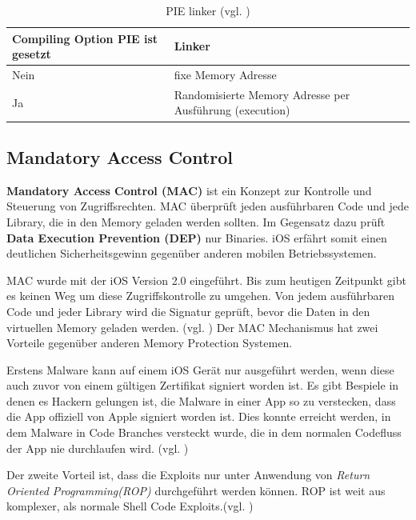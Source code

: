  \begin{table}
    \begin{center}
        \begin{tabular}{|p{6cm}|p{9cm}|} \hline
            Compiling Option PIE ist gesetzt & Linker  \\ \hline
            Nein & fixe Memory Adresse\\ \hline
            Ja & Randomisierte Memory Adresse per Ausführung (execution)\\ \hline
        \end{tabular}
        \caption{PIE linker (vgl. \cite{iOSSec[5]})}
       \label{tab:PIE linker }
    \end{center}
\end{table}

\subsection{Mandatory Access Control}
\label{sec:MAC}

 \textbf{Mandatory Access Control (MAC)} ist ein Konzept zur Kontrolle und Steuerung von Zugriffsrechten. MAC überprüft jeden ausführbaren Code und jede Library, die in den Memory geladen werden sollten. Im Gegensatz dazu prüft \textbf{Data Execution Prevention (DEP)} nur Binaries. iOS erfährt somit einen deutlichen Sicherheitsgewinn gegenüber anderen mobilen Betriebssystemen. \par 
 MAC wurde mit der iOS Version 2.0 eingeführt. Bis zum heutigen Zeitpunkt gibt es keinen Weg um diese Zugriffskontrolle zu umgehen. Von jedem ausführbaren Code und jeder Library wird die Signatur geprüft, bevor die Daten in den virtuellen Memory geladen werden. (vgl. \cite{iOSSec[5], Hacking[1]})
Der MAC Mechanismus hat zwei Vorteile gegenüber anderen Memory Protection Systemen. \par 
Erstens Malware kann auf einem iOS Gerät nur ausgeführt werden, wenn diese auch zuvor von einem gültigen Zertifikat signiert worden ist. Es gibt Bespiele in denen es Hackern gelungen ist, die Malware in einer App so zu verstecken, dass die App offiziell von Apple signiert worden ist. Dies konnte erreicht werden, in dem Malware in Code Branches versteckt wurde, die in dem normalen Codefluss der App nie durchlaufen wird. (vgl. \cite{iOSSec[5], Hacking[1]}) \par
 Der zweite Vorteil ist, dass die Exploits nur unter Anwendung von \textit{ \glqq Return Oriented Programming(ROP)\grqq{} } durchgeführt werden können. ROP ist weit aus komplexer, als normale Shell Code Exploits.(vgl. \cite{Architecture[1], Architecture[2], Architecture[3], ROP[1], ROP[2], iOSSec[5], Hacking[1]})

